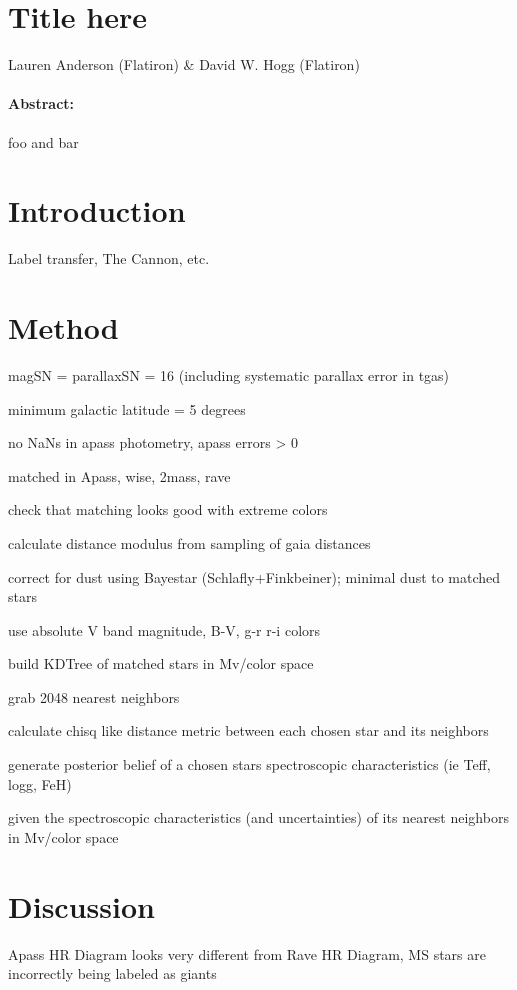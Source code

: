 \documentclass[11pt,letterpaper]{article}
\begin{document}
\section*{Title here}

\noindent
Lauren Anderson (Flatiron) \& David W. Hogg (Flatiron)

\paragraph{Abstract:}
foo and bar

\section{Introduction}

Label transfer, The Cannon, etc.

\section{Method}

magSN = parallaxSN = 16 (including systematic parallax error in tgas)

minimum galactic latitude = 5 degrees

no NaNs in apass photometry, apass errors > 0

matched in Apass, wise, 2mass, rave

check that matching looks good with extreme colors

calculate distance modulus from sampling of gaia distances

correct for dust using Bayestar (Schlafly+Finkbeiner); minimal dust to matched stars

use absolute V band magnitude, B-V, g-r r-i colors

build KDTree of matched stars in Mv/color space

grab 2048 nearest neighbors

calculate chisq like distance metric between each chosen star and its neighbors

generate posterior belief of a chosen stars spectroscopic characteristics (ie Teff, logg, FeH)

given the spectroscopic characteristics (and uncertainties) of its nearest neighbors in Mv/color space

\section{Discussion}

Apass HR Diagram looks very different from Rave HR Diagram, MS stars are incorrectly being labeled as giants
\end{document}
